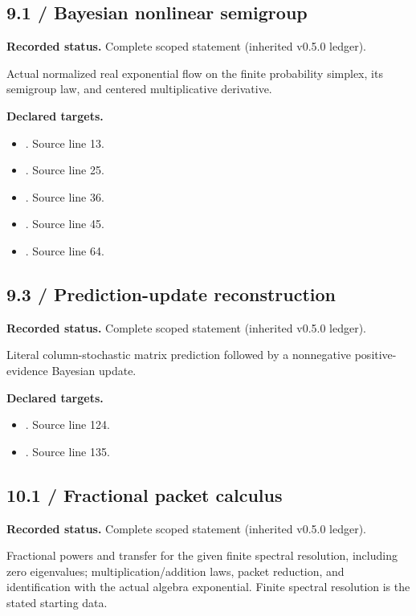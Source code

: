 \subsection{9.1 / Bayesian nonlinear semigroup}
\label{result:9.1}
\textbf{Recorded status.} Complete scoped statement (inherited v0.5.0 ledger).\par
Actual normalized real exponential flow on the finite probability simplex, its semigroup law, and centered multiplicative derivative.

\textbf{Declared targets.}\begin{itemize}
\item {}. Source line 13.
\item {}. Source line 25.
\item {}. Source line 36.
\item {}. Source line 45.
\item {}. Source line 64.
\end{itemize}
\subsection{9.3 / Prediction-update reconstruction}
\label{result:9.3}
\textbf{Recorded status.} Complete scoped statement (inherited v0.5.0 ledger).\par
Literal column-stochastic matrix prediction followed by a nonnegative positive-evidence Bayesian update.

\textbf{Declared targets.}\begin{itemize}
\item {}. Source line 124.
\item {}. Source line 135.
\end{itemize}
\subsection{10.1 / Fractional packet calculus}
\label{result:10.1}
\textbf{Recorded status.} Complete scoped statement (inherited v0.5.0 ledger).\par
Fractional powers and transfer for the given finite spectral resolution, including zero eigenvalues; multiplication/addition laws, packet reduction, and identification with the actual algebra exponential. Finite spectral resolution is the stated starting data.


